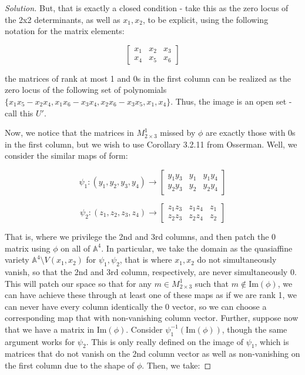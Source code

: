 \documentclass[10pt]{article}
\begin{document}
\begin{proof}[Solution]
But, that is exactly a closed condition - take this as the zero locus of the 2x2 determinants, as well as $x_1,x_2$, to be explicit, using the following notation for the matrix elements:

$$ \begin{bmatrix} x_1 & x_2  & x_3 \\ x_4 & x_5 & x_6 \end{bmatrix} $$

the matrices of rank at most 1 and 0s in the first column can be realized as the zero locus of the following set of polynomials $\{x_1x_5 - x_2x_4, x_1x_6 - x_3x_4, x_2x_6 - x_3x_5, x_1, x_4 \}$. Thus, the image is an open set - call this $U'$. 

Now, we notice that the matrices in $M^1_{2\times 3}$ missed by $\phi$ are exactly those with $0$s in the first column, but we wish to use Corollary 3.2.11 from Osserman. Well, we consider the similar maps of form:

$$ \psi_1: (y_1,y_2,y_3,y_4) \to \begin{bmatrix} y_1y_3 & y_1  & y_1y_4 \\ y_2y_3 & y_2 & y_2y_4 \end{bmatrix} $$

$$ \psi_2: (z_1,z_2,z_3,z_4) \to \begin{bmatrix} z_1z_3 & z_1z_4  & z_1 \\ z_2z_3 & z_2z_4 & z_2 \end{bmatrix} $$


That is, where we privilege the 2nd and 3rd columns, and then patch the 0 matrix using $\phi$ on all of $\mathbb{A}^4$. In particular, we take the domain as the quasiaffine variety $\mathbb{A}^4 \setminus V(x_1, x_2)$ for $\psi_1, \psi_2$, that is where $x_1,x_2$ do not simultaneously vanish, so that the 2nd and 3rd column, respectively, are never simultaneously 0. This will patch our space so that for any $m \in M^1_{2 \times 3}$ such that $m \not \in \text{Im}(\phi)$, we can have achieve these through at least one of these maps as if we are rank 1, we can never have every column identically the 0 vector, so we can choose a corresponding map that with non-vanishing column vector. Further, suppose now that we have a matrix in $\text{Im}(\phi)$. Consider $\psi_1^{-1}(\text{Im}(\phi))$, though the same argument works for $\psi_2$. This is only really defined on the image of $\psi_1$, which is matrices that do not vanish on the 2nd column vector as well as non-vanishing on the first column due to the shape of $\phi$. Then, we take:


\end{proof}
\end{document}
